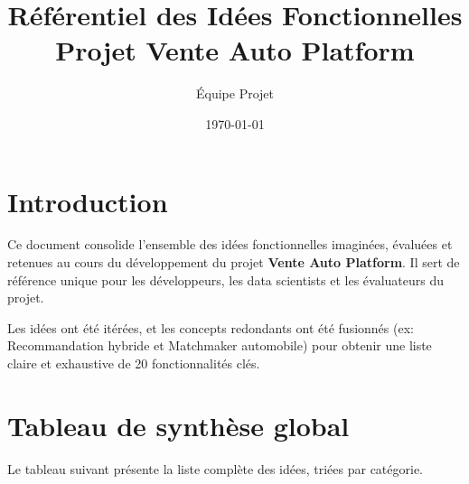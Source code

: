 \documentclass[11pt,a4paper]{article}
\title{Référentiel des Idées Fonctionnelles\\Projet Vente Auto Platform}
\author{Équipe Projet}
\date{\today}
\begin{document}
\maketitle
\tableofcontents
\newpage

\section{Introduction}
Ce document consolide l'ensemble des idées fonctionnelles imaginées, évaluées et retenues au cours du développement du projet \textbf{Vente Auto Platform}. Il sert de référence unique pour les développeurs, les data scientists et les évaluateurs du projet.

Les idées ont été itérées, et les concepts redondants ont été fusionnés (ex: Recommandation hybride et Matchmaker automobile) pour obtenir une liste claire et exhaustive de 20 fonctionnalités clés.

\section{Tableau de synthèse global}
Le tableau suivant présente la liste complète des idées, triées par catégorie.
\end{document}

